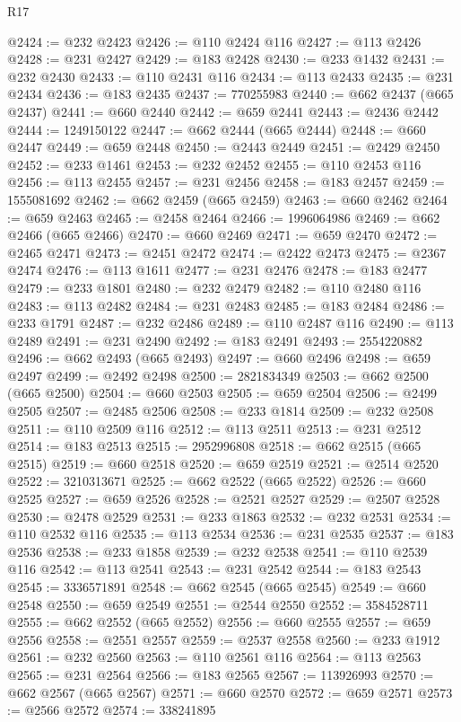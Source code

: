 \begin{lexlean}{R17}
\begin{coremodule}
{{{{{{{{{{{{{{{{{{{{{{{{{{{{{{{{{{{{{{{{{{{{{{{{{{{{{{{{{{{{{{{{{{{{{{{{{{{{{{{{{{{{{@2424 := @232 @2423
@2426 := @110 @2424 @116
@2427 := @113 @2426
@2428 := @231 @2427
@2429 := @183 @2428
@2430 := @233 @1432
@2431 := @232 @2430
@2433 := @110 @2431 @116
@2434 := @113 @2433
@2435 := @231 @2434
@2436 := @183 @2435
@2437 := 770255983
@2440 := @662 @2437 (@665 @2437)
@2441 := @660 @2440
@2442 := @659 @2441
@2443 := @2436 @2442
@2444 := 1249150122
@2447 := @662 @2444 (@665 @2444)
@2448 := @660 @2447
@2449 := @659 @2448
@2450 := @2443 @2449
@2451 := @2429 @2450
@2452 := @233 @1461
@2453 := @232 @2452
@2455 := @110 @2453 @116
@2456 := @113 @2455
@2457 := @231 @2456
@2458 := @183 @2457
@2459 := 1555081692
@2462 := @662 @2459 (@665 @2459)
@2463 := @660 @2462
@2464 := @659 @2463
@2465 := @2458 @2464
@2466 := 1996064986
@2469 := @662 @2466 (@665 @2466)
@2470 := @660 @2469
@2471 := @659 @2470
@2472 := @2465 @2471
@2473 := @2451 @2472
@2474 := @2422 @2473
@2475 := @2367 @2474
@2476 := @113 @1611
@2477 := @231 @2476
@2478 := @183 @2477
@2479 := @233 @1801
@2480 := @232 @2479
@2482 := @110 @2480 @116
@2483 := @113 @2482
@2484 := @231 @2483
@2485 := @183 @2484
@2486 := @233 @1791
@2487 := @232 @2486
@2489 := @110 @2487 @116
@2490 := @113 @2489
@2491 := @231 @2490
@2492 := @183 @2491
@2493 := 2554220882
@2496 := @662 @2493 (@665 @2493)
@2497 := @660 @2496
@2498 := @659 @2497
@2499 := @2492 @2498
@2500 := 2821834349
@2503 := @662 @2500 (@665 @2500)
@2504 := @660 @2503
@2505 := @659 @2504
@2506 := @2499 @2505
@2507 := @2485 @2506
@2508 := @233 @1814
@2509 := @232 @2508
@2511 := @110 @2509 @116
@2512 := @113 @2511
@2513 := @231 @2512
@2514 := @183 @2513
@2515 := 2952996808
@2518 := @662 @2515 (@665 @2515)
@2519 := @660 @2518
@2520 := @659 @2519
@2521 := @2514 @2520
@2522 := 3210313671
@2525 := @662 @2522 (@665 @2522)
@2526 := @660 @2525
@2527 := @659 @2526
@2528 := @2521 @2527
@2529 := @2507 @2528
@2530 := @2478 @2529
@2531 := @233 @1863
@2532 := @232 @2531
@2534 := @110 @2532 @116
@2535 := @113 @2534
@2536 := @231 @2535
@2537 := @183 @2536
@2538 := @233 @1858
@2539 := @232 @2538
@2541 := @110 @2539 @116
@2542 := @113 @2541
@2543 := @231 @2542
@2544 := @183 @2543
@2545 := 3336571891
@2548 := @662 @2545 (@665 @2545)
@2549 := @660 @2548
@2550 := @659 @2549
@2551 := @2544 @2550
@2552 := 3584528711
@2555 := @662 @2552 (@665 @2552)
@2556 := @660 @2555
@2557 := @659 @2556
@2558 := @2551 @2557
@2559 := @2537 @2558
@2560 := @233 @1912
@2561 := @232 @2560
@2563 := @110 @2561 @116
@2564 := @113 @2563
@2565 := @231 @2564
@2566 := @183 @2565
@2567 := 113926993
@2570 := @662 @2567 (@665 @2567)
@2571 := @660 @2570
@2572 := @659 @2571
@2573 := @2566 @2572
@2574 := 338241895
}}}}}}}}}}}}}}}}}}}}}}}}}}}}}}}}}}}}}}}}}}}}}}}}}}}}}}}}}}}}}}}}}}}}}}}}}}}}}}}}}}}}}
\end{coremodule}
\end{lexlean}
